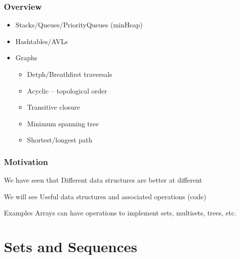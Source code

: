 \documentclass[aspectratio=169]{beamer}
\begin{document}
\frame[plain]{\titlepage}


\begin{frame}[t]\frametitle{Overview}

  \begin{itemize}
    \item Stacks/Queues/PriorityQueues (\alert{minHeap})
    \item Hashtables/AVLs
    \item Graphs
    \begin{itemize}
      \item Detph/Breathfirst traversals
      \item Acyclic -- topological order
      \item Transitive closure
      \item Minimum spanning tree
      \item Shortest/longest path
    \end{itemize}
  \end{itemize}


\end{frame}


\begin{frame}\frametitle{Motivation}
  \centering

  \begin{block}{We have seen that}
    Different \alert{data structures} are better at different 
  \end{block}

  \begin{block}{We will see}
    Useful data structures and associated operations (code)
  \end{block}

  \begin{exampleblock}{Examples}
    Arrays can have operations to implement sets, multisets, trees, etc.
  \end{exampleblock}

\end{frame}


\section{Sets and Sequences}
\end{document}
